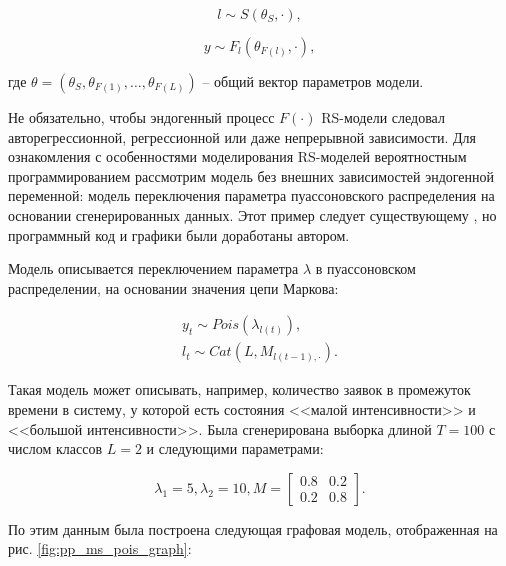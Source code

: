 \documentclass[a4paper,14pt]{extreport}
\begin{document}
\begin{equation}
	l \sim S(\theta_S, \cdot) ,
\end{equation}

\begin{equation}
	y \sim F_l(\theta_{F(l)},\cdot) ,
\end{equation}

\noindent
где $\theta = (\theta_S, \theta_{F(1)}, \dots, \theta_{F(L)}) $ -- общий вектор параметров модели. 

Не обязательно, чтобы эндогенный процесс $F(\cdot)$ RS-модели следовал авторегрессионной, регрессионной или даже непрерывной зависимости. Для ознакомления с особенностями моделирования RS-моделей вероятностным программированием рассмотрим модель без внешних зависимостей эндогенной переменной: модель переключения параметра пуассоновского распределения на основании сгенерированных данных. Этот пример следует существующему \cite{blog_hidden_markov_ravinutala}, но программный код и графики были доработаны автором.

Модель описывается переключением параметра $\lambda$ в пуассоновском распределении, на основании значения цепи Маркова:

\begin{equation}
	\begin{aligned}
		y_t \sim \mathit{Pois}(\lambda_{l(t)}) , \\
		l_t \sim \mathit{Cat}(L, M_{l(t-1), \cdot}) .
	\end{aligned}
	\label{eq:ms_pois_equation}
\end{equation}

Такая модель может описывать, например, количество заявок в промежуток времени в систему, у которой есть состояния <<малой интенсивности>> и <<большой интенсивности>>. Была сгенерирована выборка длиной $T=100$ с числом классов $L=2$ и следующими параметрами:

\begin{equation}
	\lambda_1 = 5, 
	\lambda_2 = 10,
	M = \left[ {\begin{array}{cc}
					0.8 & 0.2 \\
					0.2 & 0.8
				\end{array} } \right]
	\label{eq:ms_pois_coef_true}
	.
\end{equation}

\noindent
По этим данным была построена следующая графовая модель, отображенная на рис. \ref{fig:pp_ms_pois_graph}:
\end{document}
